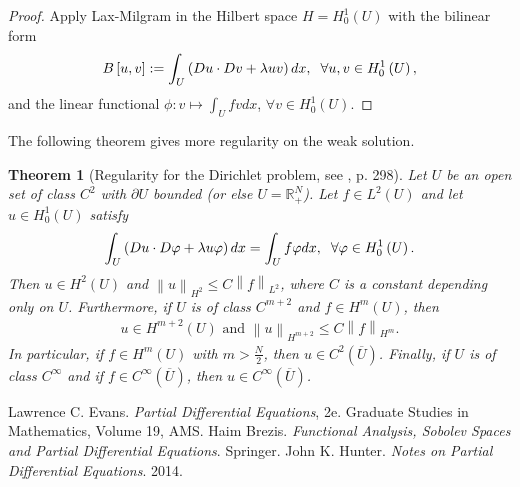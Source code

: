 \documentclass[11pt,a4paper,center,notitlepage]{article}
\numberwithin{equation}{section}
\newtheorem{theorem}{Theorem}[section]
\begin{document}
\begin{proof}
Apply Lax-Milgram in the Hilbert space $H=H_0^1\left(U\right)$ with the bilinear form
\begin{align}
B\left[ {u,v} \right]: = \int_U {\left( {Du \cdot Dv + \lambda uv} \right)dx} ,\hspace{2mm}\forall u,v \in H_0^1\left( U \right),
\end{align}
and the linear functional $\phi :v \mapsto \int_U {fvdx}$, $\forall v \in H_0^1\left( U \right)$. 
\end{proof}
The following theorem gives more regularity on the weak solution.
\begin{theorem}[Regularity for the Dirichlet problem, see \cite{2}, p. 298]\label{theorem3.5}
Let $U$ be an open set of class $C^2$ with $\partial U$ bounded (or else $U=\mathbb{R}_+^N$). Let $f\in L^2\left(U\right)$ and let $u\in H_0^1\left(U\right)$ satisfy
\begin{align}
\int_U {\left( {Du \cdot D\varphi  + \lambda u\varphi } \right)dx}  = \int_U {f\varphi dx} ,\hspace{2mm}\forall \varphi  \in H_0^1\left( U \right).
\end{align}
Then $u\in H^2\left(U\right)$ and ${\left\| u \right\|_{{H^2}}} \le C{\left\| f \right\|_{{L^2}}}$, where $C$ is a constant depending only on $U$. Furthermore, if $U$ is of class $C^{m+2}$ and $f\in H^m\left(U\right)$, then 
\begin{align}
u\in H^{m+2} \left(U\right) \mbox{ and } {\left\| u \right\|_{{H^{m + 2}}}} \le C{\left\| f \right\|_{{H^m}}} .
\end{align}
In particular, if $f\in H^m\left(U\right)$ with $m>\frac{N}{2}$, then $u\in C^2\left(\overline{U}\right)$. Finally, if $U$ is of class $C^\infty$ and if $f\in C^\infty \left(\overline{U}\right)$, then $u\in C^\infty \left(\overline{U}\right)$.
\end{theorem}








%
%
\newpage
\begin{thebibliography}{999}
 Lawrence C. Evans. \textit{Partial Differential Equations}, 2e. Graduate Studies in Mathematics, Volume 19, AMS.
 Haim Brezis. \textit{Functional Analysis, Sobolev Spaces and Partial Differential Equations}. Springer.
 John K. Hunter. \textit{Notes on Partial Differential Equations}. 2014.
\end{thebibliography}
\end{document}
